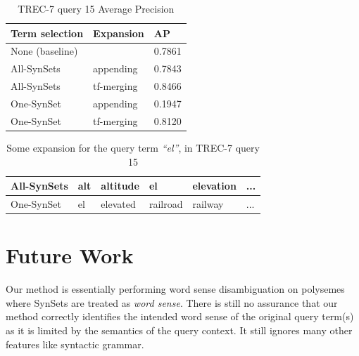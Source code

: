 \begin{table}[h]
\centering
\begin{tabular}{|l|l|l|}
\hline
Term selection  & Expansion  & AP      \\ \hline
None (baseline) &            & 0.7861 \\
All-SynSets     & appending  & 0.7843 \\
All-SynSets     & tf-merging & 0.8466 \\
One-SynSet      & appending  & 0.1947 \\
One-SynSet      & tf-merging & 0.8120 \\ \hline
\end{tabular}
\caption{TREC-7 query 15 Average Precision}
\label{table:T-7-15-map}
\end{table}

\begin{table}[h]
\centering
\begin{tabular}{|l|lllll|}
\hline
All-SynSets & alt & altitude & el       & elevation & ...        \\ \hline
One-SynSet  & el  & elevated & railroad  & railway & ... \\ \hline
\end{tabular}
\caption{Some expansion for the query term \textit{``el''}, in TREC-7 query 15}
\label{table:T-7-15-expansions}
\end{table}



\section{Future Work}
Our method is essentially performing word sense disambiguation on polysemes where SynSets are treated as \textit{word sense}. There is still no assurance that our method correctly identifies the intended word sense of the original query term(s) as it is limited by the semantics of the query context. It still ignores many other features like syntactic grammar.

